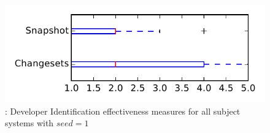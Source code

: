 
\begin{figure}
\centering
\includegraphics[height=0.4\textheight]{figures/dit_seed/rq1_tiny_1}
\caption{\rtwo: Developer Identification effectiveness measures for all subject systems with $seed=1$}
\label{fig:dit_seed:rq1:tiny}
\end{figure}

